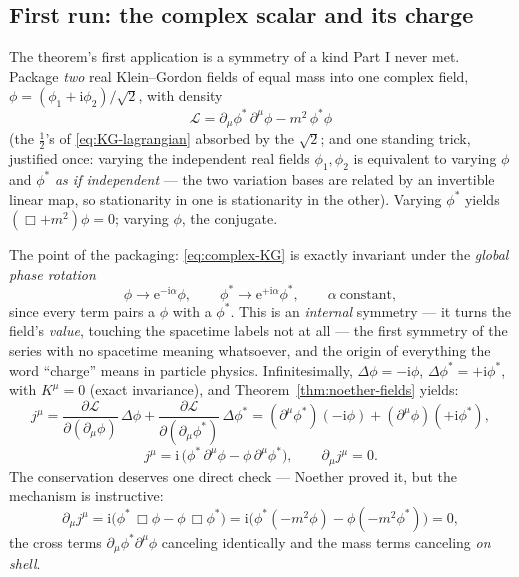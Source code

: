 \documentclass[11pt]{article}
\theoremstyle{plain}
\theoremstyle{definition}
\theoremstyle{remark}
\newcommand{\ee}{\mathrm{e}}
\newcommand{\ii}{\mathrm{i}}
\newcommand{\pd}[2]{\frac{\partial #1}{\partial #2}}
\begin{document}
\subsection{First run: the complex scalar and its charge}
\label{sec:complex-scalar}

The theorem's first application is a symmetry of a kind Part I never
met. Package \emph{two} real Klein--Gordon fields of equal mass into
one complex field, $\phi = (\phi_1 + \ii\phi_2)/\sqrt2$, with density
\begin{equation}
  \mathcal L
  = \partial_\mu\phi^*\,\partial^\mu\phi
  - m^2\,\phi^*\phi
  \label{eq:complex-KG}
\end{equation}
(the $\tfrac12$'s of \eqref{eq:KG-lagrangian} absorbed by the
$\sqrt2$; and one standing trick, justified once: varying the
independent real fields $\phi_1, \phi_2$ is equivalent to varying
$\phi$ and $\phi^*$ \emph{as if independent} --- the two variation
bases are related by an invertible linear map, so stationarity in one
is stationarity in the other). Varying $\phi^*$ yields
$(\Box + m^2)\phi = 0$; varying $\phi$, the conjugate.

The point of the packaging: \eqref{eq:complex-KG} is exactly
invariant under the \emph{global phase rotation}
\begin{equation}
  \phi \to \ee^{-\ii\alpha}\phi,
  \qquad
  \phi^* \to \ee^{+\ii\alpha}\phi^*,
  \qquad \alpha \ \text{constant},
  \label{eq:U1}
\end{equation}
since every term pairs a $\phi$ with a $\phi^*$. This is an
\emph{internal} symmetry --- it turns the field's \emph{value},
touching the spacetime labels not at all --- the first symmetry of
the series with no spacetime meaning whatsoever, and the origin of
everything the word ``charge'' means in particle physics.
Infinitesimally, $\Delta\phi = -\ii\phi$,
$\Delta\phi^* = +\ii\phi^*$, with $K^\mu = 0$ (exact invariance), and
Theorem~\ref{thm:noether-fields} yields:
\begin{equation}
  j^\mu
  = \pd{\mathcal L}{(\partial_\mu\phi)}\,\Delta\phi
  + \pd{\mathcal L}{(\partial_\mu\phi^*)}\,\Delta\phi^*
  = (\partial^\mu\phi^*)(-\ii\phi)
  + (\partial^\mu\phi)(+\ii\phi^*),
\end{equation}
\begin{equation}
  \boxed{\;
  j^\mu = \ii\,\bigl(
    \phi^*\,\partial^\mu\phi
    - \phi\,\partial^\mu\phi^*
  \bigr),
  \qquad
  \partial_\mu j^\mu = 0 .
  \;}
  \label{eq:U1-current}
\end{equation}
The conservation deserves one direct check --- Noether proved it, but
the mechanism is instructive:
\begin{equation}
  \partial_\mu j^\mu
  = \ii\bigl(
      \phi^*\,\Box\phi - \phi\,\Box\phi^*
    \bigr)
  = \ii\bigl(
      \phi^*(-m^2\phi) - \phi(-m^2\phi^*)
    \bigr)
  = 0,
\end{equation}
the cross terms $\partial_\mu\phi^*\partial^\mu\phi$ canceling
identically and the mass terms canceling \emph{on shell}.
\end{document}
